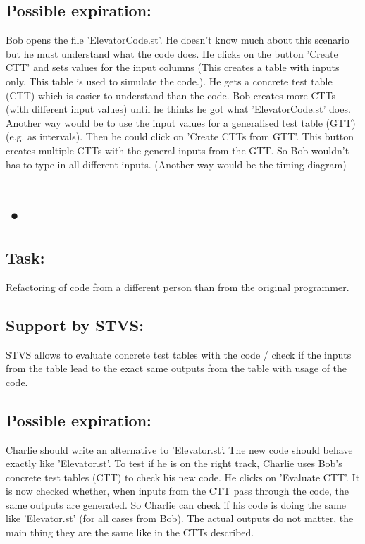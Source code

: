 \documentclass[10pt]{article}
\begin{document}
\subsection{Possible expiration:}
Bob opens the file 'ElevatorCode.st'. He doesn't know much about this scenario but he must understand what the code does. He clicks on the button 'Create CTT' and sets values for the input columns (This creates a table with inputs only. This table is used to simulate the code.). He gets a concrete test table (CTT) which is easier to understand than the code. Bob creates more CTTs (with different input values) until he thinks he got what 'ElevatorCode.st' does. Another way would be to use the input values for a generalised test table (GTT) (e.g. as intervals). Then he could click on 'Create CTTs from GTT'. This button creates multiple CTTs with the general inputs from the GTT. So Bob wouldn't has to type in all different inputs. (Another way would be the timing diagram)
\section{•}
\subsection{Task:}
Refactoring of code from a different person than from the original programmer.
\subsection{Support by STVS:}
STVS allows to evaluate concrete test tables with the code / check if the inputs from the table lead to the exact same outputs from the table with usage of the code.
\subsection{Possible expiration:}
Charlie should write an alternative to 'Elevator.st'. The new code should behave exactly like 'Elevator.st'. To test if he is on the right track, Charlie uses Bob's concrete test tables (CTT) to check his new code. He clicks on 'Evaluate CTT'. It is now checked whether, when inputs from the CTT pass through the code, the same outputs are generated. So Charlie can check if his code is doing the same like 'Elevator.st' (for all cases from Bob). The actual outputs do not matter, the main thing they are the same like in the CTTs described.
\end{document}
